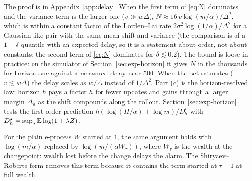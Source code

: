 The proof is in Appendix~\ref{app:delay}. When the first term of \eqref{eq:N} dominates and the variance term is the larger one ($v\gg w\Delta$), $N\approx16\,v\log(m/\alpha)/\Delta^2$, which is within a constant factor of the Lorden--Lai rate $2\sigma^2\log(1/\alpha)/\Delta^2$ for a Gaussian-like pair with the same mean shift and variance \citep{lorden1971,lai1998information} (the comparison is of a $1-\delta$ quantile with an expected delay, so it is a statement about order, not about constants; the second term of \eqref{eq:N} dominates for $\delta\lesssim0.2$). The bound is loose in practice: on the simulator of Section~\ref{sec:exp-horizon} it gives $N$ in the thousands for horizon one against a measured delay near $500$. When the
bet saturates ($v\lesssim w\Delta$) the delay scales as $w/\Delta$ instead of $1/\Delta^2$. Part (c) is the horizon-resolved law: horizon $h$ pays a factor $h$ for fewer updates and
gains through a larger margin $\Delta_h$ as the shift compounds along the rollout. Section~\ref{sec:exp-horizon} tests the first-order prediction $h(\log(H/\alpha)+\log m)/D^\star_h$ with $D^\star_h=\sup_\lambda\mathbb{E}\log(1+\lambda Z)$.

\begin{remark}
For the plain e-process $W$ started at $1$, the same argument holds with $\log(m/\alpha)$ replaced by $\log(m/(\alpha W_\tau))$, where $W_\tau$ is the wealth at the changepoint: wealth lost before the change
delays the alarm. The Shiryaev--Roberts form removes this term because it contains the term started at $\tau{+}1$ at full wealth.
\end{remark}
